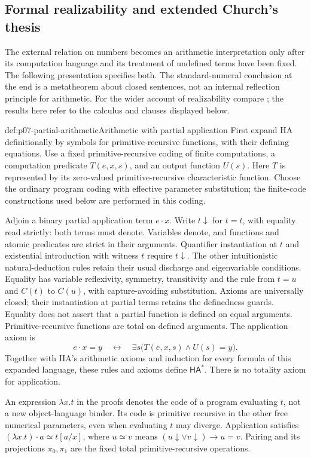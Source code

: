 \subsection{Formal realizability and extended Church's thesis}
\label{sec:p07-formal-realizability}

The external relation on numbers becomes an arithmetic interpretation
only after its computation language and its treatment of undefined
terms have been fixed. The following presentation specifies both.
The standard-numeral conclusion at the end is a metatheorem about
closed sentences, not an internal reflection principle for arithmetic.
For the wider account of realizability compare \cite{Troelstra1998};
the results here refer to the calculus and clauses displayed below.

\begin{hbdefinition}{def:p07-partial-arithmetic}{Arithmetic with partial application}
First expand HA definitionally by symbols for primitive-recursive
functions, with their defining equations. Use a fixed primitive-recursive
coding of finite computations, a computation predicate \(T(e,x,s)\),
and an output function \(U(s)\). Here \(T\) is represented by its
zero-valued primitive-recursive characteristic function. Choose the
ordinary program coding with effective parameter substitution; the
finite-code constructions used below are performed in this coding.

Adjoin a binary partial application term \(e\mathbin{\cdot}x\).
Write \(t\downarrow\) for \(t=t\), with equality read strictly:
both terms must denote. Variables denote, and functions and atomic
predicates are strict in their arguments. Quantifier instantiation
at \(t\) and existential introduction with witness \(t\) require
\(t\downarrow\). The other intuitionistic natural-deduction rules
retain their usual discharge and eigenvariable conditions. Equality
has variable reflexivity, symmetry, transitivity and the rule from
\(t=u\) and \(C(t)\) to \(C(u)\), with capture-avoiding
substitution. Axioms are universally closed; their instantiation at
partial terms retains the definedness guards. Equality does not assert
that a partial function is defined on equal arguments.
Primitive-recursive functions are total on defined arguments. The application axiom is
\[
 e\mathbin{\cdot}x=y\quad\longleftrightarrow\quad
 \exists s\bigl(T(e,x,s)\land U(s)=y\bigr).
\]
Together with HA's arithmetic axioms and induction for every formula
of this expanded language, these rules and axioms define
\(\mathsf{HA}^{\ast}\). There is no totality axiom for application.

An expression \(\lambda x.t\) in the proofs denotes the code of a
program evaluating \(t\), not a new object-language binder. Its
code is primitive recursive in the other free numerical parameters,
even when evaluating \(t\) may diverge. Application satisfies
\((\lambda x.t)\mathbin{\cdot}a\simeq t[a/x]\), where
\(u\simeq v\) means
\((u\downarrow\lor v\downarrow)\to u=v\).
Pairing and its projections \(\pi_0,\pi_1\) are the fixed total
primitive-recursive operations.
\end{hbdefinition}

